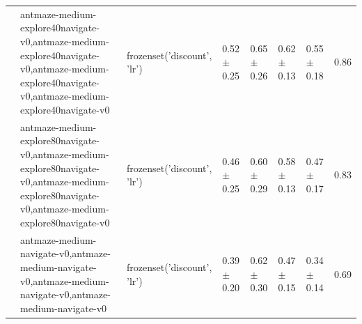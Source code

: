 \begin{tabular}{llllllll}
\cline{2-8}
 & antmaze-medium-explore40navigate-v0,antmaze-medium-explore40navigate-v0,antmaze-medium-explore40navigate-v0,antmaze-medium-explore40navigate-v0 & frozenset({'discount', 'lr'}) & 0.52 $\pm$ 0.25 & 0.65 $\pm$ 0.26 & 0.62 $\pm$ 0.13 & 0.55 $\pm$ 0.18 & 0.86 \\
\cline{2-8}
 & antmaze-medium-explore80navigate-v0,antmaze-medium-explore80navigate-v0,antmaze-medium-explore80navigate-v0,antmaze-medium-explore80navigate-v0 & frozenset({'discount', 'lr'}) & 0.46 $\pm$ 0.25 & 0.60 $\pm$ 0.29 & 0.58 $\pm$ 0.13 & 0.47 $\pm$ 0.17 & 0.83 \\
\cline{2-8}
 & antmaze-medium-navigate-v0,antmaze-medium-navigate-v0,antmaze-medium-navigate-v0,antmaze-medium-navigate-v0 & frozenset({'discount', 'lr'}) & 0.39 $\pm$ 0.20 & 0.62 $\pm$ 0.30 & 0.47 $\pm$ 0.15 & 0.34 $\pm$ 0.14 & 0.69 \\
\cline{1-8} \cline{2-8}
\bottomrule
\end{tabular}

